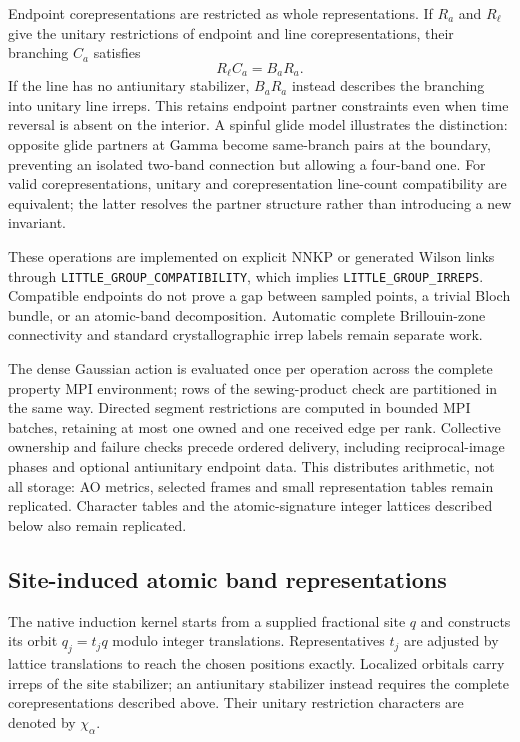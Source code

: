 Endpoint corepresentations are restricted as whole representations.
If $R_a$ and $R_\ell$ give the unitary restrictions of endpoint and
line corepresentations, their branching $C_a$ satisfies
\begin{equation}
 R_\ell C_a=B_a R_a .
 \label{eq:corep-subduction}
\end{equation}
If the line has no antiunitary stabilizer, $B_aR_a$ instead describes
the branching into unitary line irreps. This retains endpoint partner
constraints even when time reversal is absent on the interior.
A spinful glide model illustrates the distinction: opposite glide
partners at Gamma become same-branch pairs at the boundary, preventing
an isolated two-band connection but allowing a four-band one.
For valid corepresentations, unitary and corepresentation line-count
compatibility are equivalent; the latter resolves the partner
structure rather than introducing a new invariant.

These operations are implemented on explicit NNKP or generated Wilson
links through \texttt{LITTLE\_GROUP\_COMPATIBILITY}, which implies
\texttt{LITTLE\_GROUP\_IRREPS}. Compatible endpoints do not prove a gap
between sampled points, a trivial Bloch bundle, or an atomic-band
decomposition. Automatic complete Brillouin-zone connectivity and
standard crystallographic irrep labels remain separate work.

The dense Gaussian action is evaluated once per operation across the
complete property MPI environment; rows of the sewing-product check
are partitioned in the same way. Directed segment restrictions are
computed in bounded MPI batches, retaining at most one owned and one
received edge per rank. Collective ownership and failure checks
precede ordered delivery, including reciprocal-image phases and
optional antiunitary endpoint data. This distributes arithmetic,
not all storage: AO metrics, selected frames and small representation
tables remain replicated. Character tables and the atomic-signature
integer lattices described below also remain replicated.

\subsection{Site-induced atomic band representations}
The native induction kernel starts from a supplied fractional site $q$
and constructs its orbit $q_j=t_jq$ modulo integer translations.
Representatives $t_j$ are adjusted by lattice translations to reach the
chosen positions exactly. Localized orbitals carry irreps of the site
stabilizer; an antiunitary stabilizer instead requires the complete
corepresentations described above. Their unitary restriction characters
are denoted by $\chi_\alpha$.

